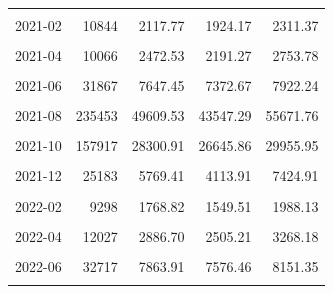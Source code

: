 \begin{longtable}[t]{crrrr}
\cellcolor{gray!10}{2021-01} & \cellcolor{gray!10}{13695} & \cellcolor{gray!10}{2764.44} & \cellcolor{gray!10}{2310.16} & \cellcolor{gray!10}{3218.73}\\
2021-02 & 10844 & 2117.77 & 1924.17 & 2311.37\\
\cellcolor{gray!10}{2021-03} & \cellcolor{gray!10}{12371} & \cellcolor{gray!10}{3033.92} & \cellcolor{gray!10}{2726.77} & \cellcolor{gray!10}{3341.06}\\
2021-04 & 10066 & 2472.53 & 2191.27 & 2753.78\\
\cellcolor{gray!10}{2021-05} & \cellcolor{gray!10}{22973} & \cellcolor{gray!10}{5783.43} & \cellcolor{gray!10}{5285.64} & \cellcolor{gray!10}{6281.23}\\
2021-06 & 31867 & 7647.45 & 7372.67 & 7922.24\\
\cellcolor{gray!10}{2021-07} & \cellcolor{gray!10}{70829} & \cellcolor{gray!10}{15674.53} & \cellcolor{gray!10}{12761.30} & \cellcolor{gray!10}{18587.77}\\
2021-08 & 235453 & 49609.53 & 43547.29 & 55671.76\\
\cellcolor{gray!10}{2021-09} & \cellcolor{gray!10}{263437} & \cellcolor{gray!10}{52075.06} & \cellcolor{gray!10}{49211.85} & \cellcolor{gray!10}{54938.26}\\
2021-10 & 157917 & 28300.91 & 26645.86 & 29955.95\\
\cellcolor{gray!10}{2021-11} & \cellcolor{gray!10}{59927} & \cellcolor{gray!10}{14281.06} & \cellcolor{gray!10}{11726.34} & \cellcolor{gray!10}{16835.78}\\
2021-12 & 25183 & 5769.41 & 4113.91 & 7424.91\\
\cellcolor{gray!10}{2022-01} & \cellcolor{gray!10}{15952} & \cellcolor{gray!10}{3073.07} & \cellcolor{gray!10}{2674.36} & \cellcolor{gray!10}{3471.79}\\
2022-02 & 9298 & 1768.82 & 1549.51 & 1988.13\\
\cellcolor{gray!10}{2022-03} & \cellcolor{gray!10}{6866} & \cellcolor{gray!10}{1675.48} & \cellcolor{gray!10}{1217.84} & \cellcolor{gray!10}{2133.13}\\
2022-04 & 12027 & 2886.70 & 2505.21 & 3268.18\\
\cellcolor{gray!10}{2022-05} & \cellcolor{gray!10}{26615} & \cellcolor{gray!10}{6738.83} & \cellcolor{gray!10}{6053.38} & \cellcolor{gray!10}{7424.29}\\
2022-06 & 32717 & 7863.91 & 7576.46 & 8151.35\\
\cellcolor{gray!10}{2022-07} & \cellcolor{gray!10}{43692} & \cellcolor{gray!10}{12685.89} & \cellcolor{gray!10}{9851.32} & \cellcolor{gray!10}{15520.46}\\

\end{longtable}
